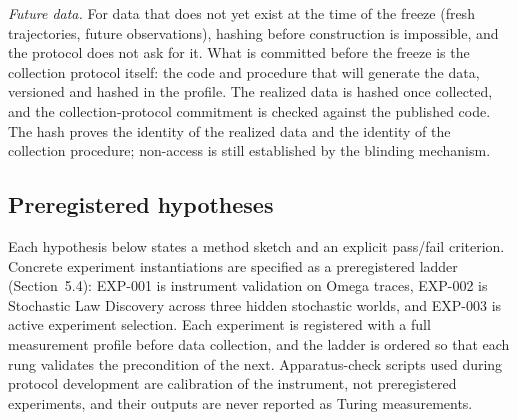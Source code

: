 \documentclass[11pt]{article}
\begin{document}
\textit{Future data.} For data that does not yet exist at the time of the freeze (fresh trajectories, future observations), hashing before construction is impossible, and the protocol does not ask for it. What is committed before the freeze is the collection protocol itself: the code and procedure that will generate the data, versioned and hashed in the profile. The realized data is hashed once collected, and the collection-protocol commitment is checked against the published code. The hash proves the identity of the realized data and the identity of the collection procedure; non-access is still established by the blinding mechanism.

\subsection{Preregistered hypotheses}

Each hypothesis below states a method sketch and an explicit pass/fail criterion. Concrete experiment instantiations are specified as a preregistered ladder (Section~5.4): EXP-001 is instrument validation on Omega traces, EXP-002 is Stochastic Law Discovery across three hidden stochastic worlds, and EXP-003 is active experiment selection. Each experiment is registered with a full measurement profile before data collection, and the ladder is ordered so that each rung validates the precondition of the next. Apparatus-check scripts used during protocol development are calibration of the instrument, not preregistered experiments, and their outputs are never reported as Turing measurements.
\end{document}

